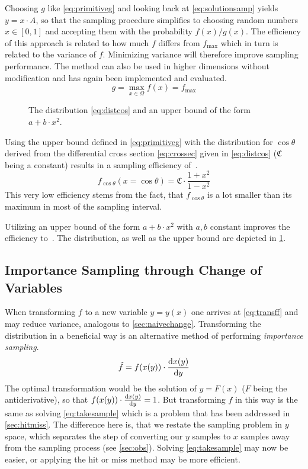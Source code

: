 Choosing \(g\) like \cref{eq:primitiveg} and looking back at
\cref{eq:solutionsamp} yields \(y = x\cdot A\), so that the sampling
procedure simplifies to choosing random numbers \(x\in [0,1]\) and
accepting them with the probability \(f(x)/g(x)\). The efficiency of
this approach is related to how much \(f\) differs from
\(f_{\text{max}}\) which in turn is related to the variance of
\(f\). Minimizing variance will therefore improve sampling
performance. The method can also be used in higher dimensions without
modification and has again been implemented and evaluated.
%
\begin{equation}
  \label{eq:primitiveg}
  g=\max_{x\in\Omega}f(x)=f_{\text{max}}
\end{equation}
%
\begin{figure}[ht]
  \centering
  \caption{\label{fig:distcos} The distribution \cref{eq:distcos} and an upper bound of
    the form \(a + b\cdot x^2\).}
\end{figure}
%
Using the upper bound defined in \cref{eq:primitiveg} with the
distribution for \(\cos\theta\) derived from the differential cross
section \cref{eq:crossec} given in \cref{eq:distcos}
(\(\mathfrak{C}\) being a constant) results in a sampling efficiency
of~.
%
\begin{equation}
  \label{eq:distcos}
  f_{\cos\theta}(x=\cos\theta) = \mathfrak{C}\cdot\frac{1+x^2}{1-x^2}
\end{equation}
%
This very low efficiency stems from the fact, that \(f_{\cos\theta}\)
is a lot smaller than its maximum in most of the sampling interval.

Utilizing an upper bound of the form \(a + b\cdot x^2\) with \(a, b\)
constant improves the efficiency
to~. The distribution, as well as the
upper bound are depicted in \cref{fig:distcos}.

\subsection{Importance Sampling through Change of Variables}%
\label{sec:importsamp}

When transforming \(f\) to a new variable \(y=y(x)\) one arrives at
\cref{eq:transff} and may reduce variance, analogous to
\cref{sec:naivechange}. Transforming the distribution in a beneficial
way is an alternative method of performing \emph{importance sampling}.
%
\begin{equation}
  \label{eq:transff}
  \tilde{f} = f(x(y)) \cdot \dv{x(y)}{y}
\end{equation}
%
The optimal transformation would be the solution of \(y = F(x)\)
(\(F\) being the antiderivative), so that
\(f(x(y)) \cdot \dv{x(y)}{y} = 1\). But transforming \(f\) in this way
is the same as solving \cref{eq:takesample} which is a problem that
has been addressed in \cref{sec:hitmiss}. The difference here is, that
we restate the sampling problem in \(y\) space, which separates the
step of converting our \(y\) samples to \(x\) samples away from the
sampling process (see \cref{sec:obs}). Solving \cref{eq:takesample}
may now be easier, or applying the hit or miss method may be more
efficient.

